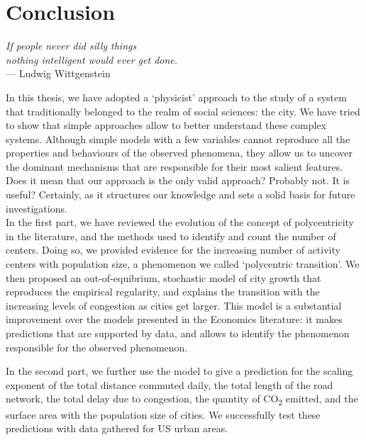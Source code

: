 %
\chapter{Conclusion}
\label{sec:conclusion}

\begin{flushright}{\slshape    
If people never did silly things\\
nothing intelligent would ever get done.} \\ \medskip
--- Ludwig Wittgenstein~\cite{Luckhardt:1979}
\end{flushright}

\bigskip

In this thesis, we have adopted a `physicist' approach to the study of a system
that traditionally belonged to the realm of social sciences: the city. We have
tried to show that simple approaches allow to better understand
these complex systems. Although simple models with a few variables cannot
reproduce all the properties and behaviours of the observed phenomena, they
allow us to uncover the dominant mechanisms that are responsible for their most
salient features. Does it mean that our approach is the only valid approach?
Probably not. It is useful? Certainly, as it structures
our knowledge and sets a solid basis for future investigations.\\

In the first part, we have reviewed the evolution of the concept of
polycentricity in the literature, and the methods used to identify and count the
number of centers. Doing so, we provided evidence for the increasing number of
activity centers with population size, a phenomenon we called `polycentric
transition'. We then proposed an out-of-equibrium, stochastic model of
city growth that reproduces the empirical regularity, and explains the
transition with the increasing levels of congestion as cities get larger. This
model is a substantial improvement over the models presented in the Economics
literature: it makes predictions that are supported by data, and allows to
identify the phenomenon responsible for the observed phenomenon. 

In the second part, we further use the model to give a prediction for the
scaling exponent of the total distance commuted daily, the total length of the
road network, the total delay due to congestion, the quantity of
CO\textsubscript{2} emitted, and the surface area with the population size of
cities. We successfully test these predictions with data gathered for US urban
areas.

